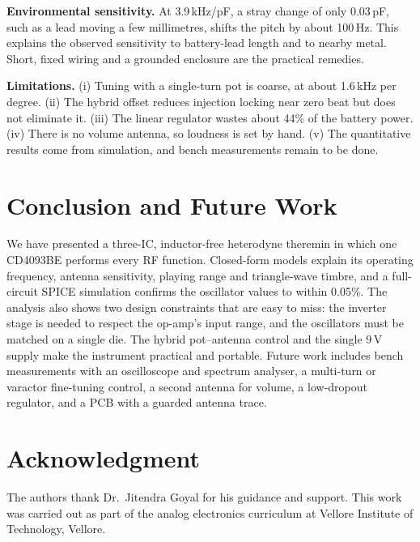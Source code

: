 \documentclass[conference]{IEEEtran}
\begin{document}
\textbf{Environmental sensitivity.} At 3.9\,kHz/pF, a stray change of only 0.03\,pF, such as a lead moving a few millimetres, shifts the pitch by about 100\,Hz. This explains the observed sensitivity to battery-lead length and to nearby metal. Short, fixed wiring and a grounded enclosure are the practical remedies.

\textbf{Limitations.} (i) Tuning with a single-turn pot is coarse, at about 1.6\,kHz per degree. (ii) The hybrid offset reduces injection locking near zero beat but does not eliminate it. (iii) The linear regulator wastes about 44\% of the battery power. (iv) There is no volume antenna, so loudness is set by hand. (v) The quantitative results come from simulation, and bench measurements remain to be done.

\section{Conclusion and Future Work}
We have presented a three-IC, inductor-free heterodyne theremin in which one CD4093BE performs every RF function. Closed-form models explain its operating frequency, antenna sensitivity, playing range and triangle-wave timbre, and a full-circuit SPICE simulation confirms the oscillator values to within 0.05\%. The analysis also shows two design constraints that are easy to miss: the inverter stage is needed to respect the op-amp's input range, and the oscillators must be matched on a single die. The hybrid pot--antenna control and the single 9\,V supply make the instrument practical and portable. Future work includes bench measurements with an oscilloscope and spectrum analyser, a multi-turn or varactor fine-tuning control, a second antenna for volume, a low-dropout regulator, and a PCB with a guarded antenna trace.

\section*{Acknowledgment}
The authors thank Dr.~Jitendra Goyal for his guidance and support. This work was carried out as part of the analog electronics curriculum at Vellore Institute of Technology, Vellore.
\end{document}
